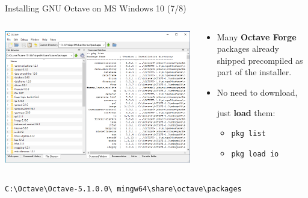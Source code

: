 \begin{frame}{Installing GNU Octave on MS Windows 10 (7/8)}
\begin{columns}
\begin{column}{0.55\textwidth}
\includegraphics[width=\textwidth]{res/ms_windows/win_octave_packages.png}
\end{column}
\begin{column}{0.35\textwidth}
\begin{itemize}
\itemsep1em
\item
Many \textbf{\color{DarkBlue}Octave Forge} packages
already shipped precompiled as part of the installer.

\item
No need to download,

just \textbf{load} them:

\begin{itemize}
\itemsep1em
\item
\texttt{pkg list}
\item
\texttt{pkg load io}
\end{itemize}
\end{itemize}
\end{column}
\end{columns}
\bigskip
\texttt{C:\textbackslash Octave\textbackslash Octave-5.1.0.0\textbackslash
  mingw64\textbackslash share\textbackslash octave\textbackslash packages}
\end{frame}



